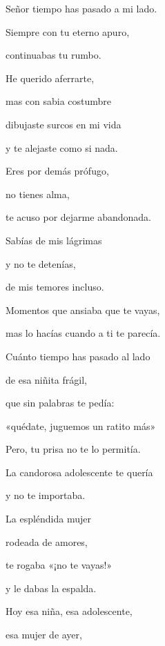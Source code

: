 \documentclass[11pt,twoside,openright,a5paper]{book}
\begin{document}
\begin{center}
Señor tiempo has pasado a mi lado.

Siempre con tu eterno apuro,

continuabas tu rumbo.

\vspace{0.5cm} 

He querido aferrarte,

mas con sabia costumbre

dibujaste surcos en mi vida

y te alejaste como si nada.

\vspace{0.5cm}

Eres por demás prófugo, 

no tienes alma,

te acuso por dejarme abandonada.

\vspace{0.5cm}

Sabías de mis lágrimas

y no te detenías,

de  mis temores incluso.

\vspace{0.5cm}

Momentos que ansiaba que te vayas,

mas lo hacías cuando a ti te parecía.
 
Cuánto tiempo has pasado al lado

de esa niñita frágil,

que sin palabras te pedía:

«quédate, juguemos un ratito más»

\vspace{0.5cm}

Pero, tu prisa no te lo permitía.
 
La candorosa adolescente te quería

y no te importaba.

\vspace{0.5cm}

La espléndida mujer 

rodeada de amores,

te rogaba «¡no te vayas!»

y le dabas la espalda.

\vspace{0.5cm}

Hoy esa niña, esa adolescente,

esa mujer de ayer,


\end{center}
\end{document}
